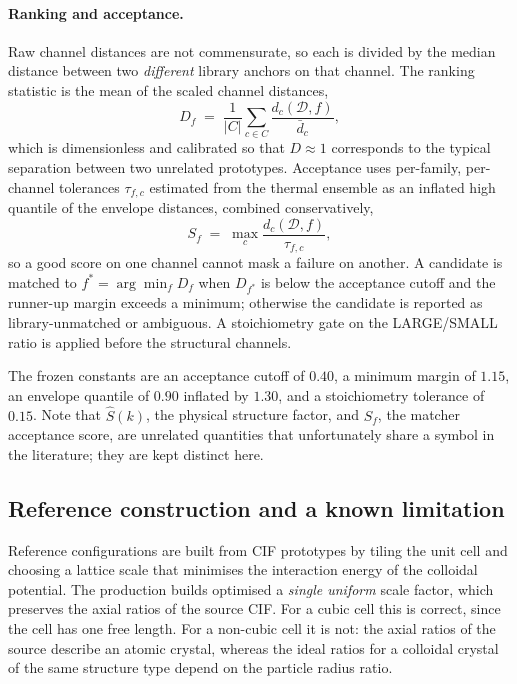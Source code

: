 \paragraph{Ranking and acceptance.} Raw channel distances are not commensurate, so each is
divided by the median distance between two \emph{different} library anchors on that channel.
The ranking statistic is the mean of the scaled channel distances,
\begin{equation}
  D_f \;=\; \frac{1}{|C|}\sum_{c \in C} \frac{d_c(\mathcal{D}, f)}{\bar{d}_c},
  \label{eq:matcher-D}
\end{equation}
which is dimensionless and calibrated so that $D \approx 1$ corresponds to the typical
separation between two unrelated prototypes. Acceptance uses per-family, per-channel
tolerances $\tau_{f,c}$ estimated from the thermal ensemble as an inflated high quantile of
the envelope distances, combined conservatively,
\begin{equation}
  S_f \;=\; \max_{c} \frac{d_c(\mathcal{D}, f)}{\tau_{f,c}} ,
  \label{eq:matcher-S}
\end{equation}
so a good score on one channel cannot mask a failure on another. A candidate is matched to
$f^{\ast} = \arg\min_f D_f$ when $D_{f^{\ast}}$ is below the acceptance cutoff and the
runner-up margin exceeds a minimum; otherwise the candidate is reported as
library-unmatched or ambiguous. A stoichiometry gate on the LARGE/SMALL ratio is applied
before the structural channels.

The frozen constants are an acceptance cutoff of $0.40$, a minimum margin of $1.15$, an
envelope quantile of $0.90$ inflated by $1.30$, and a stoichiometry tolerance of $0.15$.
Note that $\hat{S}(k)$, the physical structure factor, and $S_f$, the matcher acceptance
score, are unrelated quantities that unfortunately share a symbol in the literature; they
are kept distinct here.

\subsection{Reference construction and a known limitation}
\label{sec:refbuild}

Reference configurations are built from CIF prototypes by tiling the unit cell and choosing
a lattice scale that minimises the interaction energy of the colloidal potential. The
production builds optimised a \emph{single uniform} scale factor, which preserves the axial
ratios of the source CIF. For a cubic cell this is correct, since the cell has one free
length. For a non-cubic cell it is not: the axial ratios of the source describe an atomic
crystal, whereas the ideal ratios for a colloidal crystal of the same structure type depend
on the particle radius ratio.

